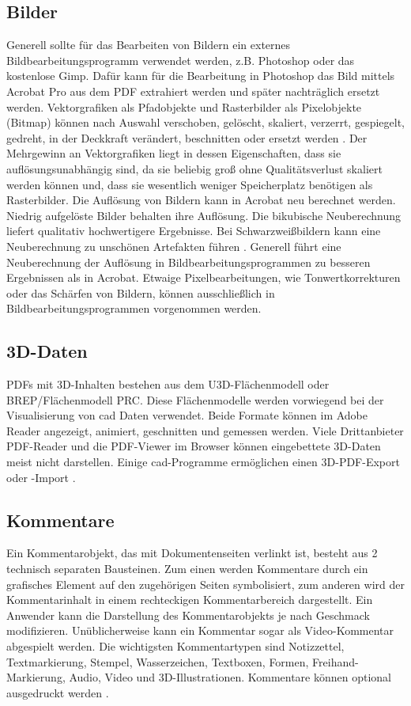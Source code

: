 \subsection{Bilder}
Generell sollte für das Bearbeiten von Bildern ein externes Bildbearbeitungsprogramm verwendet werden, z.B. Photoshop oder das kostenlose Gimp. Dafür kann für die Bearbeitung in Photoshop das Bild mittels Acrobat Pro aus dem PDF extrahiert werden und später nachträglich ersetzt werden. Vektorgrafiken als Pfadobjekte und Rasterbilder als Pixelobjekte (Bitmap) können nach Auswahl verschoben, gelöscht, skaliert, verzerrt, gespiegelt, gedreht, in der Deckkraft verändert, beschnitten oder ersetzt werden \cite{schneeberger}. Der Mehrgewinn an Vektorgrafiken liegt in dessen Eigenschaften, dass sie auflösungsunabhängig sind, da sie beliebig groß ohne Qualitätsverlust skaliert werden können und, dass sie wesentlich weniger Speicherplatz benötigen als Rasterbilder. Die Auflösung von Bildern kann in Acrobat neu berechnet werden. Niedrig aufgelöste Bilder behalten ihre Auflösung. Die bikubische Neuberechnung liefert qualitativ hochwertigere Ergebnisse. Bei Schwarzweißbildern kann eine Neuberechnung zu unschönen Artefakten führen \cite{buehler}. Generell führt eine Neuberechnung der Auflösung in Bildbearbeitungsprogrammen zu besseren Ergebnissen als in Acrobat. Etwaige Pixelbearbeitungen, wie Tonwertkorrekturen oder das Schärfen von Bildern, können ausschließlich in Bildbearbeitungsprogrammen vorgenommen werden. 

\subsection{3D-Daten}
PDFs mit 3D-Inhalten bestehen aus dem U3D-Flächenmodell oder BREP/Flächenmodell PRC. Diese Flächenmodelle werden vorwiegend bei der Visualisierung von \gls{cad} Daten verwendet. Beide Formate können im Adobe Reader angezeigt, animiert, geschnitten und gemessen werden. Viele Drittanbieter PDF-Reader und die PDF-Viewer im Browser können eingebettete 3D-Daten meist nicht darstellen. Einige \gls{cad}-Programme ermöglichen einen 3D-PDF-Export oder -Import \cite{wiki-pdf-de}. 

\subsection{Kommentare}
Ein Kommentarobjekt, das mit Dokumentenseiten verlinkt ist, besteht aus 2 technisch separaten Bausteinen. Zum einen werden Kommentare durch ein grafisches Element auf den zugehörigen Seiten symbolisiert, zum anderen wird der Kommentarinhalt in einem rechteckigen Kommentarbereich dargestellt. Ein Anwender kann die Darstellung des Kommentarobjekts je nach Geschmack modifizieren. Unüblicherweise kann ein Kommentar sogar als Video-Kommentar abgespielt werden. Die wichtigsten Kommentartypen sind Notizzettel, Textmarkierung, Stempel, Wasserzeichen, Textboxen, Formen, Freihand-Markierung, Audio, Video und 3D-Illustrationen. Kommentare können optional ausgedruckt werden \cite{softx}. 

